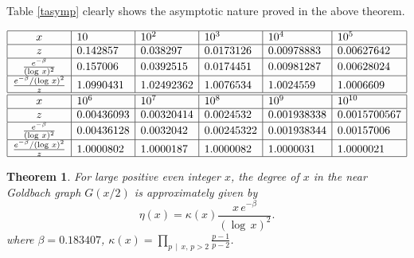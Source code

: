 \documentclass[11pt]{article}
\newtheorem{theorem}{Theorem}[section]
\theoremstyle{definition}
\theoremstyle{remark}
\numberwithin{equation}{section}
\newcommand{\Div}[2]{#1\,\mid\, #2}
\begin{document}
\noindent 
Table \ref{tasymp} clearly shows the asymptotic nature proved in the above theorem.

\begin{table}[ht]
{\footnotesize $$\begin{array}{|c|l|l|l|l|l|}
\hline
x & 10 & 10^2 & 10^3 & 10^4 & 10^5 \\ 
\hline
z & 0.142857 & 0.038297 & 0.0173126 & 0.00978883 & 0.00627642\\ 
\hline
\frac{e^{-\beta}}{(\log\, x)^2} & 0.157006 & 0.0392515 & 0.0174451 & 0.00981287 & 0.00628024 \\
\hline
\frac{e^{-\beta}/(\log\, x)^2}{z} & 1.0990431 & 1.02492362 & 1.0076534 & 1.0024559 & 1.0006609 \\
\hline
\hline
x & 10^6 & 10^7 & 10^8 & 10^9 & 10^{10}\\
\hline
z & 0.00436093 & 0.00320414 & 0.0024532 &  0.001938338 & 0.0015700567 \\
\hline
\frac{e^{-\beta}}{(\log\, x)^2} &  0.00436128 & 0.0032042 & 0.00245322 & 0.001938344 & 0.00157006\\
\hline
\frac{e^{-\beta}/(\log\, x)^2}{z} & 
 1.0000802 & 1.0000187 & 1.0000082 & 1.0000031 & 1.0000021\\
\hline
\end{array}$$}
\caption{Comparison between $z$ and $\frac{e^{-\beta}}{(\log\, x)^2}$.}\label{tasymp}
\end{table}

\vspace{1em}
\begin{theorem}\label{thmetaa}
For large positive even integer $x$, the degree of $x$ in the near Goldbach graph $G(x/2)$ is approximately given by
$$\eta(x)=\kappa(x) \frac{x\, e^{-\beta}}{(\log\, x)^2}.$$
where $\beta=0.183407$, $\displaystyle{\kappa(x)=\prod\limits_{\Div{p}{x},\, p>2} \frac{p-1}{p-2}}$.
\end{theorem}
\end{document}
